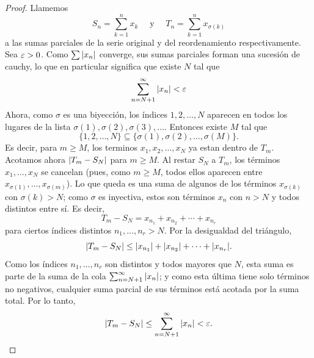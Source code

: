 \documentclass[12pt,a4paper]{article}
\begin{document}
    \begin{proof}
        Llamemos
        \begin{equation*}
            S_{n}=\sum_{k=1}^{n}x_{k}\quad\text{ y }\quad T_{n}=\sum_{k=1}^{n}x_{\sigma(k)}
        \end{equation*}
        a las sumas parciales de la serie original y del reordenamiento respectivamente.
        Sea $\varepsilon>0$. Como $\sum \abs{x_{n}}$ converge, sus sumas parciales forman una sucesión
        de cauchy, lo que en particular significa que existe $N$ tal que
        \begin{equation*}
            \sum_{n=N+1}^{\infty}\abs{x_{n}}<\varepsilon
        \end{equation*}
        Ahora, como $\sigma$ es una biyección, los índices $1,2,\dots,N$ aparecen en todos los
        lugares de la lista $\sigma(1),\sigma(2),\sigma(3),\dots$. Entonces existe $M$ tal que
        \begin{equation*}
            \{1,2,\dots,N\}\subseteq\{\sigma(1),\sigma(2),\dots,\sigma(M)\}.
        \end{equation*}
        Es decir, para $m\geq M$, los terminos $x_{1},x_{2},\dots,x_{N}$
        ya estan dentro de $T_{m}$. Acotamos ahora $\abs{T_{m}-S_{N}}$ para
        $m\geq M$. Al restar $S_N$ a $T_m$, los términos $x_1,\dots,x_N$ se cancelan
        (pues, como $m\geq M$, todos ellos aparecen entre $x_{\sigma(1)},\dots,x_{\sigma(m)}$).
        Lo que queda es una suma de algunos de los términos $x_{\sigma(k)}$ con $\sigma(k)>N$;
        como $\sigma$ es inyectiva, estos son términos $x_{n}$ con $n>N$ y todos distintos
        entre sí. Es decir,
        \begin{equation*}
            T_{m}-S_{N}=x_{n_{1}}+x_{n_{2}}+\cdots+x_{n_{r}}
        \end{equation*}
        para ciertos índices distintos $n_{1},\dots,n_{r}>N$. Por la desigualdad del triángulo,
        \begin{equation*}
            \abs{T_{m}-S_{N}}\leq\abs{x_{n_{1}}}+\abs{x_{n_{2}}}+\cdots+\abs{x_{n_{r}}}.
        \end{equation*}
        Como los índices $n_{1},\dots,n_{r}$ son distintos y todos mayores que $N$, esta suma es
        parte de la suma de la cola $\sum_{n=N+1}^{\infty}\abs{x_{n}}$; y como esta última tiene
        solo términos no negativos, cualquier suma parcial de sus términos está acotada por la suma
        total. Por lo tanto,
        \begin{equation*}
            \abs{T_{m}-S_{N}}\leq\sum_{n=N+1}^{\infty}\abs{x_{n}}\lt\e.

\end{equation*}
\end{proof}
\end{document}
